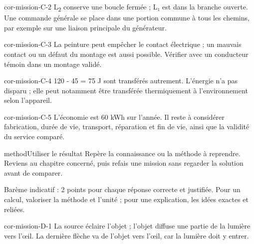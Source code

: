 \documentclass[12pt,twoside,openany]{book}
\begin{document}
\begin{blocLivre}{cor-mission-C-2}
L\textsubscript{2} conserve une boucle fermée ; L₁ est dans la branche ouverte. Une commande générale se place dans une portion commune à tous les chemins, par exemple sur une liaison principale du générateur.\par
{}
\end{blocLivre}
\begin{blocLivre}{cor-mission-C-3}
La peinture peut empêcher le contact électrique ; un mauvais contact ou un défaut du montage est aussi possible. Vérifier avec un conducteur témoin dans un montage validé.\par
\end{blocLivre}
\begin{blocLivre}{cor-mission-C-4}
120 - 45 = 75 J sont transférés autrement. L’énergie n’a pas disparu ; elle peut notamment être transférée thermiquement à l’environnement selon l’appareil.\par
{}
\end{blocLivre}
\begin{blocLivre}{cor-mission-C-5}
L’économie est 60 kWh sur l’année. Il reste à considérer fabrication, durée de vie, transport, réparation et fin de vie, ainsi que la validité du service comparé.\par
\begin{pcEncadre}{method}{Utiliser le résultat}
Repère la connaissance ou la méthode à reprendre. Reviens au chapitre concerné, puis refais une mission sans regarder la solution avant de comparer.\par
\end{pcEncadre}
\end{blocLivre}
\label{cor-bilan-D}
Barème indicatif : 2 points pour chaque réponse correcte et justifiée. Pour un calcul, valoriser la méthode et l’unité ; pour une explication, les idées exactes et reliées.\par
\begin{blocLivre}{cor-mission-D-1}
La source éclaire l’objet ; l’objet diffuse une partie de la lumière vers l’œil. La dernière flèche va de l’objet vers l’œil, car la lumière doit y entrer.\par
{}
\end{blocLivre}
\end{document}
